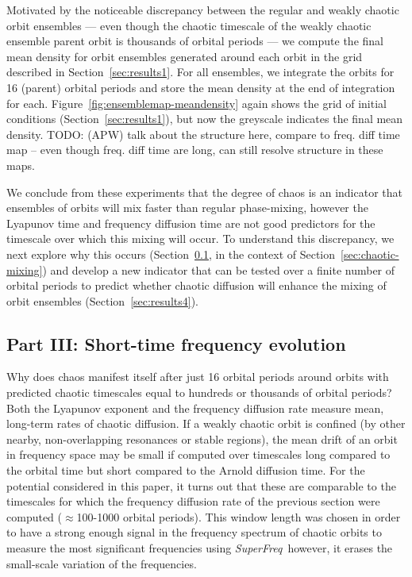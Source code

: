 \documentclass[letterpaper,12pt,preprint]{aastex}
\newcommand{\project}[1]{\textsl{#1}}
\newcommand{\superfreq}{\project{SuperFreq}}
\newcommand{\todo}[2]{{\color{red} TODO: (\MakeUppercase{#1}) #2}}
\begin{document}
Motivated by the noticeable discrepancy between the regular and weakly chaotic orbit ensembles --- even though the chaotic timescale of the weakly chaotic ensemble parent orbit is thousands of orbital periods --- we compute the final mean density for orbit ensembles generated around each orbit in the grid described in Section~\ref{sec:results1}. For all ensembles, we integrate the orbits for 16 (parent) orbital periods and store the mean density at the end of integration for each. Figure~\ref{fig:ensemblemap-meandensity} again shows the grid of initial conditions (Section~\ref{sec:results1}), but now the greyscale indicates the final mean density. \todo{apw}{talk about the structure here, compare to freq. diff time map -- even though freq. diff time are long, can still resolve structure in these maps.}

We conclude from these experiments that the degree of chaos is an indicator that ensembles of orbits will mix faster than regular phase-mixing, however the Lyapunov time and frequency diffusion time are not good predictors for the timescale over which this mixing will occur. To understand this discrepancy, we next explore why this occurs (Section~\ref{sec:results3}, in the context of Section~\ref{sec:chaotic-mixing}) and develop a new indicator that can be tested over a finite number of orbital periods to predict whether chaotic diffusion will enhance the mixing of orbit ensembles (Section~\ref{sec:results4}).

\subsection{Part III: Short-time frequency evolution}\label{sec:results3}

Why does chaos manifest itself after just 16 orbital periods around orbits with predicted chaotic timescales equal to hundreds or thousands of orbital periods? Both the Lyapunov exponent and the frequency diffusion rate measure mean, long-term rates of chaotic diffusion. If a weakly chaotic orbit is confined (by other nearby, non-overlapping resonances or stable regions), the mean drift of an orbit in frequency space may be small if computed over timescales long compared to the orbital time but short compared to the Arnold diffusion time. For the potential considered in this paper, it turns out that these are comparable to the timescales for which the frequency diffusion rate of the previous section were computed ($\approx$100-1000 orbital periods). This window length was chosen in order to have a strong enough signal in the frequency spectrum of chaotic orbits to measure the most significant frequencies using \superfreq\, however, it erases the small-scale variation of the frequencies. 
\end{document}
